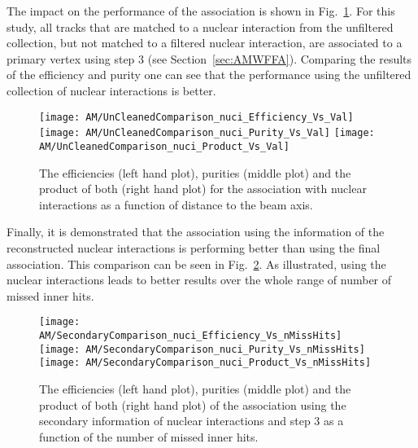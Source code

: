 The impact on the performance of the association is shown in Fig.~\ref{plot:AMWFSVnuciEffAndPurRT}. For this study, all tracks that are matched to a nuclear interaction from the unfiltered collection, but not matched to a filtered nuclear interaction, are associated to a primary vertex using step 3 (see Section~\ref{sec:AMWFFA}). Comparing the results of the efficiency and purity one can see that the performance using the unfiltered collection of nuclear interactions is better.

\begin{figure}[!ht]
    \centering
    \texttt{[image: AM/UnCleanedComparison\_nuci\_Efficiency\_Vs\_Val]}
    \texttt{[image: AM/UnCleanedComparison\_nuci\_Purity\_Vs\_Val]}
    \texttt{[image: AM/UnCleanedComparison\_nuci\_Product\_Vs\_Val]}
    \caption[Efficiencies, purities and their product for the association with nuclear interactions a function of distance to the beam axis]{The efficiencies (left hand plot), purities (middle plot) and the product of both (right hand plot) for the association with nuclear interactions as a function of distance to the beam axis. \label{plot:AMWFSVnuciEffAndPurRT}}
\end{figure}

Finally, it is demonstrated that the association using the information of the reconstructed nuclear interactions is performing better than using the final association. This comparison can be seen in Fig.~\ref{plot:AMWFSVnuciEffAndPurVsFA}. As illustrated, using the nuclear interactions leads to better results over the whole range of number of missed inner hits.

\begin{figure}[!ht]
    \centering
    \texttt{[image: AM/SecondaryComparison\_nuci\_Efficiency\_Vs\_nMissHits]}
    \texttt{[image: AM/SecondaryComparison\_nuci\_Purity\_Vs\_nMissHits]}
    \texttt{[image: AM/SecondaryComparison\_nuci\_Product\_Vs\_nMissHits]}
    \caption[Efficiencies, purities and their product for the association with nuclear interactions vs final association as a function of missed inner hits]{The efficiencies (left hand plot), purities (middle plot) and the product of both (right hand plot) of the association using the secondary information of nuclear interactions and step 3 as a function of the number of missed inner hits.\label{plot:AMWFSVnuciEffAndPurVsFA}}
\end{figure}

